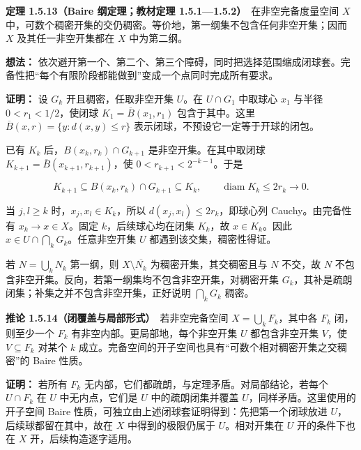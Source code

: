 \documentclass[11pt,a4paper]{article}
\begin{document}
\textbf{定理 1.5.13（Baire 纲定理；教材定理
1.5.1---1.5.2）}　在非空完备度量空间 \(X\)
中，可数个稠密开集的交仍稠密。等价地，第一纲集不包含任何非空开集；因而
\(X\) 及其任一非空开集都在 \(X\) 中为第二纲。

\textbf{想法：}
依次避开第一个、第二个、第三个障碍，同时把选择范围缩成闭球套。完备性把``每个有限阶段都能做到''变成一个点同时完成所有要求。

\textbf{证明：} 设 \(G_k\) 开且稠密，任取非空开集 \(U\)。在
\(U\cap G_1\) 中取球心 \(x_1\) 与半径 \(0<r_1<1/2\)，使闭球
\(K_1=\overline B(x_1,r_1)\) 包含于其中。这里
\(\overline B(x,r)=\{y:d(x,y)\le r\}\)
表示闭球，不预设它一定等于开球的闭包。

已有 \(K_k\) 后，\(B(x_k,r_k)\cap G_{k+1}\) 是非空开集。在其中取闭球
\(K_{k+1}=\overline B(x_{k+1},r_{k+1})\)，使
\(0<r_{k+1}<2^{-k-1}\)。于是

\begin{equation*}
K_{k+1}\subseteq B(x_k,r_k)\cap G_{k+1}\subseteq K_k,
\qquad \operatorname{diam}K_k\le2r_k\longrightarrow0.
\tag{1.5.12}
\end{equation*}

当 \(j,l\ge k\) 时，\(x_j,x_l\in K_k\)，所以
\(d(x_j,x_l)\le2r_k\)，即球心列 Cauchy。由完备性有
\(x_k\to x\in X\)。固定 \(k\)，后续球心均在闭集 \(K_k\)，故
\(x\in K_k\)。因此 \(x\in U\cap\bigcap_kG_k\)。任意非空开集 \(U\)
都遇到该交集，稠密性得证。

若 \(N=\bigcup_kN_k\) 第一纲，则 \(X\setminus\overline{N_k}\)
为稠密开集，其交稠密且与 \(N\) 不交，故 \(N\)
不包含非空开集。反向，若第一纲集均不包含非空开集，对稠密开集
\(G_k\)，其补是疏朗闭集；补集之并不包含非空开集，正好说明
\(\bigcap_kG_k\) 稠密。

\textbf{推论 1.5.14（闭覆盖与局部形式）}　若非空完备空间
\(X=\bigcup_kF_k\)，其中各 \(F_k\) 闭，则至少一个 \(F_k\)
有非空内部。更局部地，每个非空开集 \(U\) 都包含非空开集 \(V\)，使
\(V\subseteq F_k\) 对某个 \(k\)
成立。完备空间的开子空间也具有``可数个相对稠密开集之交稠密''的 Baire
性质。

\textbf{证明：} 若所有 \(F_k\)
无内部，它们都疏朗，与定理矛盾。对局部结论，若每个 \(U\cap F_k\) 在
\(U\) 中无内点，它们是 \(U\) 中的疏朗闭集并覆盖
\(U\)，同样矛盾。这里使用的开子空间 Baire
性质，可独立由上述闭球套证明得到：先把第一个闭球放进
\(U\)，后续球都留在其中，故在 \(X\) 中得到的极限仍属于 \(U\)。相对开集在
\(U\) 开的条件下也在 \(X\) 开，后续构造逐字适用。
\end{document}
